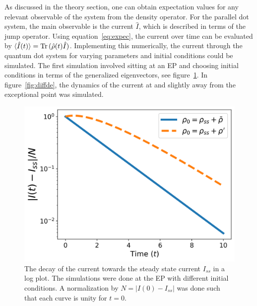 \documentclass[../main.tex]{subfiles}
\begin{document}
As discussed in the theory section, one can obtain expectation values for any relevant observable of the system from the density operator. For the parallel dot system, the main observable is the current $\hat I$, which is described in terms of the jump operator. Using equation~\eqref{eq:expec}, the current over time can be evaluated by $\braket{\hat I(t)} = \operatorname{Tr}{(\hat \rho(t)\hat I)}$. Implementing this numerically, the current through the quantum dot system for varying parameters and initial conditions could be simulated. The first simulation involved sitting at an EP and choosing initial conditions in terms of the generalized eigenvectors, see figure~\ref{fig:diffrho0}. In figure~\ref{fig:diffde}, the dynamics of the current at and slightly away from the exceptional point was simulated.
\begin{figure}[H]
    \centering
    \begin{minipage}[t]{0.48\textwidth}
        \centering
        \includegraphics[width=\textwidth]{figures/current_diff_rho_0.png}
        \caption{The decay of the current towards the steady state current $I_{ss}$ in a log plot. The simulations were done at the EP with different initial conditions. A normalization by $N=|I(0) - I_{ss}|$ was done such that each curve is unity for $t=0$.}
    \label{fig:diffrho0}
    \end{minipage}\hfill
    \begin{minipage}[t]{0.48\textwidth}
        \centering

\end{minipage}
\end{figure}
\end{document}
